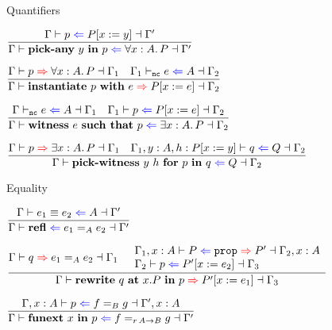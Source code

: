 \begin{frame}{Quantifiers}

\begin{center}
  $\infrule{\checkproof{\Gamma}{p}{\subst{P}{x}{y}}{\Gamma'}}{\checkproof{\Gamma}{\allintro{y}{p}}{\All{x}[A]{P}}{\Gamma'}}$

  \vspace{2em}

  $\infrule{\inferproof{\Gamma}{p}{\All{x}[A]{P}}{\Gamma_1} \quad \checktype{\Gamma_1}[\noncomputable]{e}{A}{\Gamma_2}}{\inferproof{\Gamma}{\allelim{p}{e}}{\subst{P}{x}{e}}{\Gamma_2}}$

  \vspace{2em}

  $\infrule{\checktype{\Gamma}[\noncomputable]{e}{A}{\Gamma_1} \quad \checkproof{\Gamma_1}{p}{\subst{P}{x}{e}}{\Gamma_2}}{\checkproof{\Gamma}{\exintro{e}{p}}{\Ex{x}[A]{P}}{\Gamma_2}}$

  \vspace{2em}

  $\infrule{\inferproof{\Gamma}{p}{\Ex{x}[A]{P}}{\Gamma_1} \quad \checkproof{\assume{\extend{\Gamma_1}{y}{A}}{h}{\subst{P}{x}{y}}}{q}{Q}{\Gamma_2}}{\checkproof{\Gamma}{\exelim{y}{h}{p}{q}}{Q}{\Gamma_2}}$
\end{center}

\end{frame}

\begin{frame}{Equality}

\begin{center}
  $\infrule{\checktermconv{\Gamma}{e_1}{e_2}{A}{\Gamma'}}{\checkproof{\Gamma}{\refl}{\Eq[A]{e_1}{e_2}}{\Gamma'}}$

  \vspace{2em}

  $\infrule{\inferproof{\Gamma}{q}{\Eq[A]{e_1}{e_2}}{\Gamma_1} \quad \begin{array}{l} \checkprop{\extend{\Gamma_1}{x}{A}}{P}{P'}{\extend{\Gamma_2}{x}{A}} \\ \checkproof{\Gamma_2}{p}{\subst{P'}{x}{e_2}}{\Gamma_3} \end{array}}{\inferproof{\Gamma}{\rewrite{q}[x.P]{p}}{\subst{P'}{x}{e_1}}{\Gamma_3}}$

  \vspace{2em}

  $\infrule{\checkproof{\extend{\Gamma}{x}{A}}{p}{\Eq[B]{f}{g}}{\extend{\Gamma'}{x}{A}}}{\checkproof{\Gamma}{\funext{x}{p}}{\Eq[\Fun[r]{A}{B}]{f}{g}}{\Gamma'}}$
\end{center}

\end{frame}

